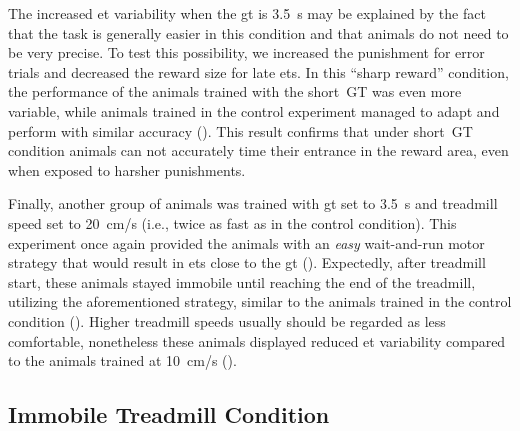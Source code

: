 The increased \gls{et} variability when the \gls{gt} is 3.5~s may be explained by the fact that the task is generally easier in this condition and that animals do not need to be very precise.
To test this possibility, we increased the punishment for error trials and decreased the reward size for late \glspl{et}.
In this ``sharp reward'' condition, the performance of the animals trained with the short~GT was even more variable, while animals trained in the control experiment managed to adapt and perform with similar accuracy ().
This result confirms that under short~GT condition animals can not accurately time their entrance in the reward area, even when exposed to harsher punishments.
\par
Finally, another group of animals was trained with \gls{gt} set to 3.5~s and treadmill speed set to 20~cm/s (i.e., twice as fast as in the control condition).
This experiment once again provided the animals with an \textit{easy} wait-and-run motor strategy that would result in \glspl{et} close to the \gls{gt} ().
Expectedly, after treadmill start, these animals stayed immobile until reaching the end of the treadmill, utilizing the aforementioned strategy, similar to the animals trained in the control condition ().
Higher treadmill speeds usually should be regarded as less comfortable, nonetheless these animals displayed reduced \gls{et} variability compared to the animals trained at 10~cm/s ().


\subsection[Immobile Condition]{Immobile Treadmill Condition}
\label{ch:time:immobile}

